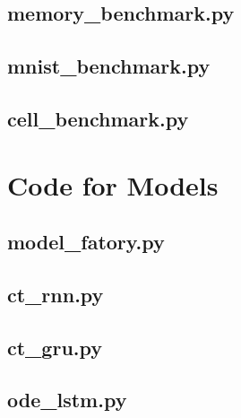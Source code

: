 \documentclass[draft,final]{vutinfth} %
\begin{document}
    \subsection{memory\_benchmark.py}
    

    \subsection{mnist\_benchmark.py}
    

    \subsection{cell\_benchmark.py}
    


    \section{Code for Models}

    \subsection{model\_fatory.py}
    

    \subsection{ct\_rnn.py}
    

    \subsection{ct\_gru.py}
    

    \subsection{ode\_lstm.py}
    
\end{document}

